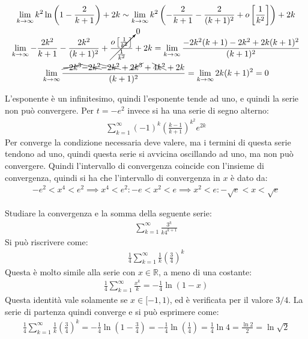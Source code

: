 \documentclass{article}
\numberwithin{equation}{subsection}
\begin{document}
\begin{gather*}
    \displaystyle\lim_{k\to\infty}k^2\ln\left(1-\frac{2}{k+1}\right)+2k\sim
    \lim_{k\to\infty}k^2\left(-\frac{2}{k+1}-\frac{2}{(k+1)^2}+o\left[\frac{1}{k^2}\right]\right)+2k\\
    \lim_{k\to\infty}-\frac{2k^2}{k+1}-\frac{2k^2}{(k+1)^2}+\cancelto{0}{\frac{o\left[\frac{1}{k^2}\right]}{\frac{1}{k^2}}}+2k=
    \lim_{k\to\infty}\frac{-2k^2(k+1)-2k^2+2k(k+1)^2}{(k+1)^2}\\
    \lim_{k\to\infty}\frac{\cancel{-2k^3}\bcancel{-2k^2}\bcancel{-2k^2}+\cancel{2k^3}+\bcancel{4k^2}+2k}{(k+1)^2}=
    \lim_{k\to\infty}{2k}{(k+1)^2}=0
\end{gather*}

L'esponente è un infinitesimo, quindi l'esponente tende ad uno, e quindi la serie non può convergere. Per $t=-e^2$ invece si ha una serie di segno alterno:
\begin{gather*}
    \displaystyle\sum_{k=1}^\infty(-1)^k\left(\frac{k-1}{k+1}\right)^{k^2}e^{2k}
\end{gather*}
Per converge la condizione necessaria deve valere, ma i termini di questa serie tendono ad uno, quindi questa serie si avvicina oscillando ad uno, ma non può convergere. Quindi l'intervallo di convergenza coincide con l'insieme di convergenza, quindi si ha che l'intervallo di convergenza in $x$ è dato da:
\begin{gather*}
    -e^2<x^4<e^2\implies x^4<e^2:-e<x^2<e\implies x^2<e:-\sqrt{e}<x<\sqrt{e}
\end{gather*}


Studiare la convergenza e la somma della seguente serie:
\begin{gather*}
    \displaystyle\sum_{k=1}^\infty\frac{3^k}{k4^{k+1}}
\end{gather*}
Si può riscrivere come:
\begin{gather*}
    \displaystyle\frac{1}{4}\sum_{k=1}^\infty\frac{1}{k}\left(\frac{3}{4}\right)^k
\end{gather*}
Questa è molto simile alla serie con $x\in\mathbb{R}$, a meno di una costante:
\begin{gather*}
    \displaystyle\frac{1}{4}\sum_{k=1}^\infty\frac{x^k}{k}=-\frac{1}{4}\ln(1-x)
\end{gather*}
Questa identità vale solamente se $x\in[-1,1)$, ed è verificata per il valore $3/4$. La serie di partenza quindi converge e si può esprimere come:
\begin{gather*}
    \displaystyle\frac{1}{4}\sum_{k=1}^\infty\frac{1}{k}\left(\frac{3}{4}\right)^k=
    -\frac{1}{4}\ln\left(1-\frac{3}{4}\right)=-\frac{1}{4}\ln\left(\frac{1}{4}\right)=
    \frac{1}{4}\ln4=\frac{\ln2}{2}=\ln\sqrt{2}
\end{gather*}
\end{document}
